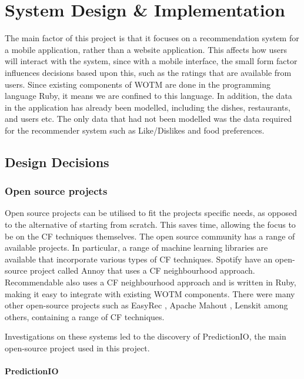 \chapter{System Design \& Implementation}\label{C:work_done}

The main factor of this project is that it focuses on a recommendation system for a mobile application, rather than a website application. This affects how users will interact with the system, since with a mobile interface, the small form factor influences decisions based upon this, such as the ratings that are available from users. Since existing components of WOTM are done in the programming language Ruby, it means we are confined to this language. In addition, the data in the application has already been modelled, including the dishes, restaurants, and users etc. The only data that had not been modelled was the data required for the recommender system such as Like/Dislikes and food preferences.   

\section{Design Decisions}

\subsection{Open source projects}

Open source projects can be utilised to fit the projects specific needs, as opposed to the alternative of starting from scratch. This saves time, allowing the focus to be on the CF techniques themselves. The open source community has a range of available projects. In particular, a range of machine learning libraries are available that incorporate various types of CF techniques. Spotify \cite{annoy} have an open-source project called Annoy \cite{annoy} that uses a CF neighbourhood approach. Recommendable \cite{recommendable} also uses a CF neighbourhood approach and is written in Ruby, making it easy to integrate with existing WOTM components. There were many other open-source projects such as EasyRec \cite{easyrec}, Apache Mahout \cite{mahoutaction}, Lenskit \cite{lenskit} among others, containing a range of CF techniques. 

Investigations on these systems led to the discovery of PredictionIO, the main open-source project used in this project.

\subsubsection{PredictionIO}

